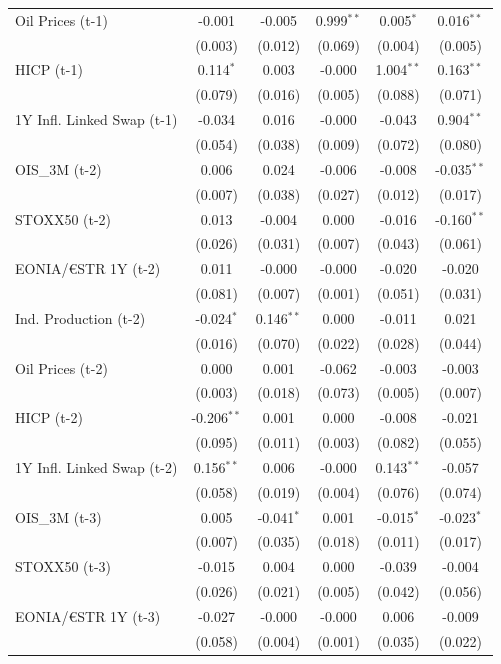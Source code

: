 \begin{longtable}[t]{lccccc}
Oil Prices (t-1) & -0.001 & -0.005 & 0.999$^{**}$ & 0.005$^{*}$ & 0.016$^{**}$\\
 & (0.003) & (0.012) & (0.069) & (0.004) & (0.005)\\
HICP (t-1) & 0.114$^{*}$ & 0.003 & -0.000 & 1.004$^{**}$ & 0.163$^{**}$\\
 & (0.079) & (0.016) & (0.005) & (0.088) & (0.071)\\
1Y Infl. Linked Swap (t-1) & -0.034 & 0.016 & -0.000 & -0.043 & 0.904$^{**}$\\
 & (0.054) & (0.038) & (0.009) & (0.072) & (0.080)\\
OIS\_3M (t-2) & 0.006 & 0.024 & -0.006 & -0.008 & -0.035$^{**}$\\
 & (0.007) & (0.038) & (0.027) & (0.012) & (0.017)\\
STOXX50 (t-2) & 0.013 & -0.004 & 0.000 & -0.016 & -0.160$^{**}$\\
 & (0.026) & (0.031) & (0.007) & (0.043) & (0.061)\\
EONIA/€STR 1Y (t-2) & 0.011 & -0.000 & -0.000 & -0.020 & -0.020\\
 & (0.081) & (0.007) & (0.001) & (0.051) & (0.031)\\
Ind. Production (t-2) & -0.024$^{*}$ & 0.146$^{**}$ & 0.000 & -0.011 & 0.021\\
 & (0.016) & (0.070) & (0.022) & (0.028) & (0.044)\\
Oil Prices (t-2) & 0.000 & 0.001 & -0.062 & -0.003 & -0.003\\
 & (0.003) & (0.018) & (0.073) & (0.005) & (0.007)\\
HICP (t-2) & -0.206$^{**}$ & 0.001 & 0.000 & -0.008 & -0.021\\
 & (0.095) & (0.011) & (0.003) & (0.082) & (0.055)\\
1Y Infl. Linked Swap (t-2) & 0.156$^{**}$ & 0.006 & -0.000 & 0.143$^{**}$ & -0.057\\
 & (0.058) & (0.019) & (0.004) & (0.076) & (0.074)\\
OIS\_3M (t-3) & 0.005 & -0.041$^{*}$ & 0.001 & -0.015$^{*}$ & -0.023$^{*}$\\
 & (0.007) & (0.035) & (0.018) & (0.011) & (0.017)\\
STOXX50 (t-3) & -0.015 & 0.004 & 0.000 & -0.039 & -0.004\\
 & (0.026) & (0.021) & (0.005) & (0.042) & (0.056)\\
EONIA/€STR 1Y (t-3) & -0.027 & -0.000 & -0.000 & 0.006 & -0.009\\
 & (0.058) & (0.004) & (0.001) & (0.035) & (0.022)\\

\end{longtable}
